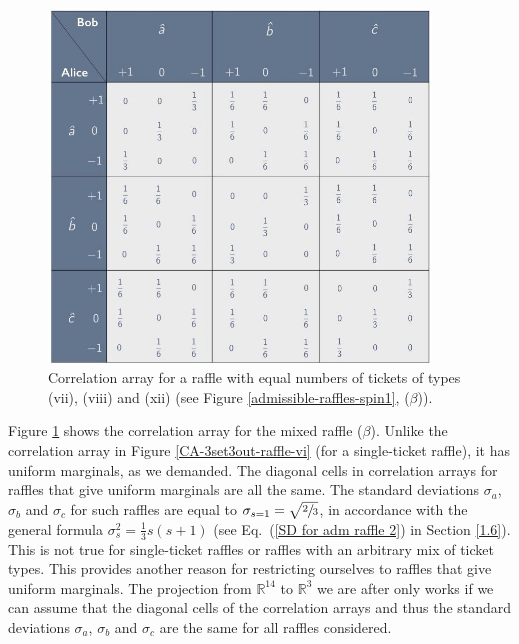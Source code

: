 \begin{figure}[h]
 \centering
   \includegraphics[width=4in]{CA-3set3out-raffle-33vi33viii33xii.jpeg} 
   \caption{Correlation array for a raffle with equal numbers of tickets of types (vii), (viii) and (xii) (see Figure \ref{admissible-raffles-spin1}, ($\beta$)).}
   \label{CA-3set3out-raffle-33vi33viii33xii}
\end{figure}

Figure \ref{CA-3set3out-raffle-33vi33viii33xii} shows the correlation array for the mixed raffle ($\beta$). Unlike the correlation array in Figure \ref{CA-3set3out-raffle-vi} (for a single-ticket raffle), it has uniform marginals, as we demanded. The diagonal cells in correlation arrays for raffles that give uniform marginals are all the same. The standard deviations $\sigma_a$, $\sigma_b$ and $\sigma_c$ for such raffles are equal to $\sigma_{s=1} = \sqrt{\sfrac23}$, in accordance with the general formula $\sigma_s^2 = \frac13 s(s+1)$ (see Eq.\ (\ref{SD for adm raffle 2}) in Section \ref{1.6}). This is not true for single-ticket raffles or raffles with an arbitrary mix of ticket types. This provides another reason for restricting ourselves to raffles that give uniform marginals. The projection from $\mathbb{R}^{14}$ to $\mathbb{R}^3$ we are after only works if we can assume that the diagonal cells of the correlation arrays and thus the standard deviations $\sigma_a$, $\sigma_b$ and $\sigma_c$ are the same for all raffles considered.

